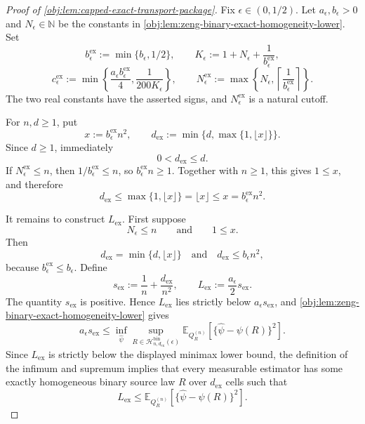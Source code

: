 \documentclass[11pt]{article}
\begin{document}
\begin{proof}[Proof of \cref{obj:lem:capped-exact-transport-package}]
Fix \(\epsilon\in(0,1/2)\).  Let \(a_\epsilon,b_\epsilon>0\) and \(N_\epsilon\in\mathbb N\) be the constants in \cref{obj:lem:zeng-binary-exact-homogeneity-lower}.  Set
\[
b_{\epsilon}^{\mathrm{ex}}:=\min\{b_\epsilon,1/2\},
\qquad
K_\epsilon:=1+N_\epsilon+\frac1{b_{\epsilon}^{\mathrm{ex}}},
\]
\[
c_{\epsilon}^{\mathrm{ex}}
:=
\min\left\{\frac{a_\epsilon b_{\epsilon}^{\mathrm{ex}}}{4},
\frac{1}{200K_\epsilon}\right\},
\qquad
N_{\epsilon}^{\mathrm{ex}}
:=
\max\left\{N_\epsilon,\left\lceil\frac1{b_{\epsilon}^{\mathrm{ex}}}\right\rceil\right\}.
\]
The two real constants have the asserted signs, and \(N_{\epsilon}^{\mathrm{ex}}\) is a natural cutoff. %

For \(n,d\ge1\), put
\[
x:=b_{\epsilon}^{\mathrm{ex}}n^2,
\qquad
d_{\mathrm{ex}}
:=
\min\{d,\max\{1,\lfloor x\rfloor\}\}.
\]
Since \(d\ge1\), immediately
\[
0<d_{\mathrm{ex}}\le d .
\]
If \(N_{\epsilon}^{\mathrm{ex}}\le n\), then \(1/b_{\epsilon}^{\mathrm{ex}}\le n\), so \(b_{\epsilon}^{\mathrm{ex}}n\ge1\).  Together with \(n\ge1\), this gives \(1\le x\), and therefore
\[
d_{\mathrm{ex}}
\le
\max\{1,\lfloor x\rfloor\}
=
\lfloor x\rfloor
\le x
=
b_{\epsilon}^{\mathrm{ex}}n^2 .
\]

It remains to construct \(L_{\mathrm{ex}}\).  First suppose
\[
N_\epsilon\le n
\qquad\text{and}\qquad
1\le x .
\]
Then
\[
d_{\mathrm{ex}}=\min\{d,\lfloor x\rfloor\}
\quad\text{and}\quad
d_{\mathrm{ex}}\le b_\epsilon n^2,
\]
because \(b_{\epsilon}^{\mathrm{ex}}\le b_\epsilon\).  Define
\[
s_{\mathrm{ex}}:=\frac1n+\frac{d_{\mathrm{ex}}}{n^2},
\qquad
L_{\mathrm{ex}}:=\frac{a_\epsilon}{2}s_{\mathrm{ex}} .
\]
The quantity \(s_{\mathrm{ex}}\) is positive.  Hence \(L_{\mathrm{ex}}\) lies strictly below
\(a_\epsilon s_{\mathrm{ex}}\), and \cref{obj:lem:zeng-binary-exact-homogeneity-lower} gives
\[
a_\epsilon s_{\mathrm{ex}}
\le
\inf_{\widehat\psi}
\sup_{R\in\mathcal H_{n,d_{\mathrm{ex}}}^{\mathrm{bin}}(\epsilon)}
\mathbb E_{Q_R^{(n)}}\!\left[
\{\widehat\psi-\psi(R)\}^2
\right].
\]
Since \(L_{\mathrm{ex}}\) is strictly below the displayed minimax lower bound, the definition of the infimum and supremum implies that every measurable estimator has some exactly homogeneous binary source law \(R\) over \(d_{\mathrm{ex}}\) cells such that
\[
L_{\mathrm{ex}}
\le
\mathbb E_{Q_R^{(n)}}\!\left[
\{\widehat\psi-\psi(R)\}^2
\right].
\]


\end{proof}
\end{document}
